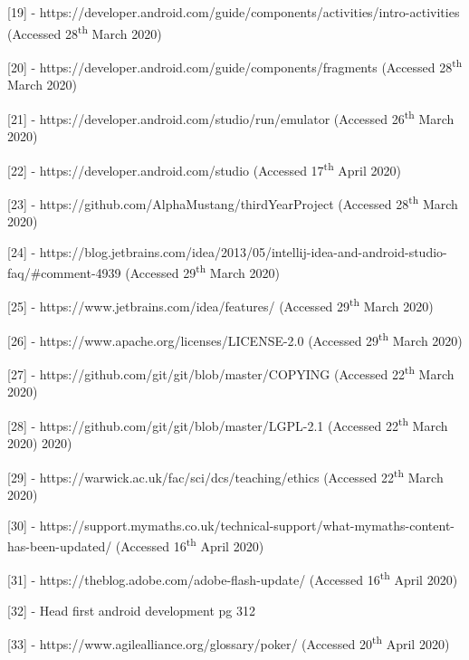 \documentclass{article}
\begin{document}
[19] - https://developer.android.com/guide/components/activities/intro-activities (Accessed 28\textsuperscript{th} March 2020) \par

[20] - https://developer.android.com/guide/components/fragments (Accessed 28\textsuperscript{th} March 2020) \par

[21] - https://developer.android.com/studio/run/emulator (Accessed 26\textsuperscript{th} March 2020) \par

[22] - https://developer.android.com/studio (Accessed 17\textsuperscript{th} April 2020) \par

[23] - https://github.com/AlphaMustang/thirdYearProject (Accessed 28\textsuperscript{th} March 2020) \par

[24] - https://blog.jetbrains.com/idea/2013/05/intellij-idea-and-android-studio-faq/\#comment-4939 (Accessed 29\textsuperscript{th} March 2020) \par

[25] - https://www.jetbrains.com/idea/features/ (Accessed 29\textsuperscript{th} March 2020) \par

[26] - https://www.apache.org/licenses/LICENSE-2.0 (Accessed 29\textsuperscript{th} March 2020) \par

[27] - https://github.com/git/git/blob/master/COPYING (Accessed 22\textsuperscript{th} March 2020) \par

[28] - https://github.com/git/git/blob/master/LGPL-2.1 (Accessed 22\textsuperscript{th} March 2020) 2020) \par

[29] - https://warwick.ac.uk/fac/sci/dcs/teaching/ethics (Accessed 22\textsuperscript{th} March 2020) \par

[30] - https://support.mymaths.co.uk/technical-support/what-mymaths-content-has-been-updated/ (Accessed 16\textsuperscript{th} April 2020) \par

[31] - https://theblog.adobe.com/adobe-flash-update/ (Accessed 16\textsuperscript{th} April 2020) \par

[32] - Head first android development pg 312

[33] - https://www.agilealliance.org/glossary/poker/ (Accessed 20\textsuperscript{th} April 2020)
\end{document}
